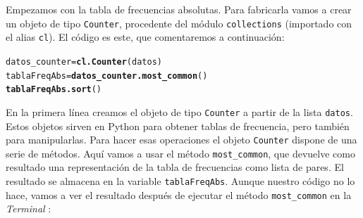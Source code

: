 \documentclass[10pt,a4paper]{article}\usepackage[]{graphicx}\usepackage[]{color}
\makeatletter
\newcommand{\hlstd}[1]{\textcolor[rgb]{0.345,0.345,0.345}{#1}}%
\newcommand{\hlkwb}[1]{\textcolor[rgb]{0.69,0.353,0.396}{#1}}%
\newcommand{\hlkwd}[1]{\textcolor[rgb]{0.737,0.353,0.396}{\textbf{#1}}}%
\newenvironment{kframe}{%
 \def\at@end@of@kframe{}%
 \ifinner\ifhmode%
  \def\at@end@of@kframe{\end{minipage}}%
  \begin{minipage}{\columnwidth}%
 \fi\fi%
 \def\FrameCommand##1{\hskip\@totalleftmargin \hskip-\fboxsep
 \colorbox{shadecolor}{##1}\hskip-\fboxsep
     \hskip-\linewidth \hskip-\@totalleftmargin \hskip\columnwidth}%
 \MakeFramed {\advance\hsize-\width
   \@totalleftmargin\z@ \linewidth\hsize
   \@setminipage}}%
 {\par\unskip\endMakeFramed%
 \at@end@of@kframe}
\newenvironment{knitrout}{}{} %
\newcounter {cont01}
\makeatother
\begin{document}
Empezamos con la tabla de frecuencias absolutas. Para fabricarla vamos a crear un objeto  de tipo {\tt Counter}, procedente del módulo {\tt collections} (importado con el alias {\tt cl}). El código es este, que comentaremos a continuación:

\begin{knitrout}
\color{fgcolor}\begin{kframe}
\begin{alltt}
\hlstd{datos_counter} \hlkwb{=} \hlkwd{cl.Counter}\hlstd{(datos)}
\hlstd{tablaFreqAbs} \hlkwb{=} \hlkwd{datos_counter.most_common}\hlstd{()}
\hlkwd{tablaFreqAbs.sort}\hlstd{()}
\end{alltt}
\end{kframe}
\end{knitrout}

En la primera línea creamos el objeto de tipo {\tt Counter} a partir de la lista {\tt datos}. Estos objetos sirven en Python para obtener tablas de frecuencia, pero también para manipularlas. Para hacer esas operaciones el objeto {\tt Counter} dispone de una serie de métodos. Aquí vamos a usar el método \verb&most_common&, que devuelve como resultado una representación de la tabla de frecuencias como lista de pares. El resultado se almacena en la variable {\tt tablaFreqAbs}. Aunque nuestro código no lo hace, vamos a ver el resultado  después de ejecutar el método \verb&most_common& en la {\em Terminal} :
\end{document}

